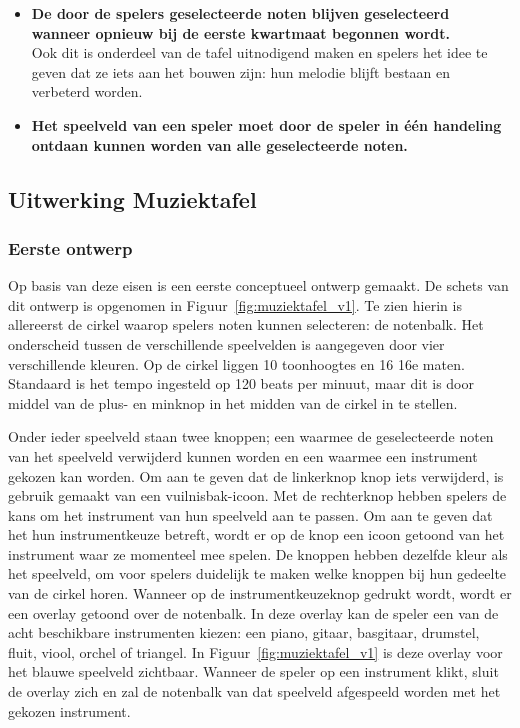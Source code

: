 \documentclass{acm}
\begin{document}
\begin{itemize}
	\item \textbf{De door de spelers geselecteerde noten blijven geselecteerd wanneer opnieuw bij de eerste kwartmaat begonnen wordt.} \\ Ook dit is onderdeel van de tafel uitnodigend maken en spelers het idee te geven dat ze iets aan het bouwen zijn: hun melodie blijft bestaan en verbeterd worden.
	\item \textbf{Het speelveld van een speler moet door de speler in \'e\'en handeling ontdaan kunnen worden van alle geselecteerde noten.}
\end{itemize}

\subsection{Uitwerking Muziektafel}
\subsubsection{Eerste ontwerp}

Op basis van deze eisen is een eerste conceptueel ontwerp gemaakt. De schets van dit ontwerp is opgenomen in Figuur~\ref{fig:muziektafel_v1}. Te zien hierin is allereerst de cirkel waarop spelers noten kunnen selecteren: de notenbalk. Het onderscheid tussen de verschillende speelvelden is aangegeven door vier verschillende kleuren. Op de cirkel liggen 10 toonhoogtes en 16 16e maten. Standaard is het tempo ingesteld op 120 beats per minuut, maar dit is door middel van de plus- en minknop in het midden van de cirkel in te stellen.

Onder ieder speelveld staan twee knoppen; een waarmee de geselecteerde noten van het speelveld verwijderd kunnen worden en een waarmee een instrument gekozen kan worden. Om aan te geven dat de linkerknop knop iets verwijderd, is gebruik gemaakt van een vuilnisbak-icoon. Met de rechterknop hebben spelers de kans om het instrument van hun speelveld aan te passen. Om aan te geven dat het hun instrumentkeuze betreft, wordt er op de knop een icoon getoond van het instrument waar ze momenteel mee spelen. De knoppen hebben dezelfde kleur als het speelveld, om voor spelers duidelijk te maken welke knoppen bij hun gedeelte van de cirkel horen. Wanneer op de instrumentkeuzeknop gedrukt wordt, wordt er een overlay getoond over de notenbalk. In deze overlay kan de speler een van de acht beschikbare instrumenten kiezen: een piano, gitaar, basgitaar, drumstel, fluit, viool, orchel of triangel. In Figuur~\ref{fig:muziektafel_v1} is deze overlay voor het blauwe speelveld zichtbaar. Wanneer de speler op een instrument klikt, sluit de overlay zich en zal de notenbalk van dat speelveld afgespeeld worden met het gekozen instrument.
\end{document}

